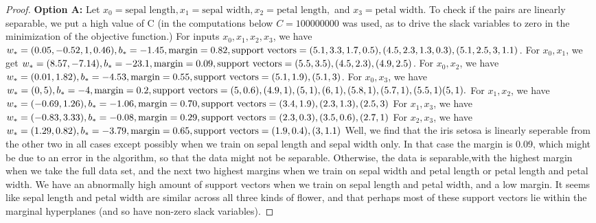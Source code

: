 \documentclass[12pt]{article}
\begin{document}
\begin{proof}  \bigbreak
  \textbf{ Option A:}
  Let $x_0 = \text {sepal length}, x_1 = \text{sepal width}, x_2 = \text{petal length},$ and $x_3 = \text{petal width}$. To check if the pairs are linearly separable, we put a high value of C
  (in the computations below $C = 100000000$ was used, as to drive the slack variables to zero in the minimization of the objective function.)
  \bigbreak
  For inputs $x_0,x_1,x_2,x_3$, we have $w_* = (0.05, -0.52, 1, 0.46), b_* = -1.45, \text{margin} = 0.82, \\
  \text{support vectors} = (5.1,3.3,1.7,0.5), (4.5,2.3,1.3,0.3), (5.1,2.5,3,1.1)$.
  \bigbreak
  For $x_0, x_1$, we get $w_* = (8.57, -7.14), b_* = -23.1, \text{margin} = 0.09, \\
  \text{support vectors} = (5.5,3.5), (4.5, 2.3), (4.9, 2.5)$.
  \bigbreak
  For $x_0, x_2$, we have $w_* = (0.01, 1.82), b_*=-4.53, \text{margin} = 0.55, \\
  \text{support vectors} = (5.1,1.9), (5.1, 3)$.
  \bigbreak
  For $x_0, x_3$, we have $w_* = (0, 5), b_* = -4, \text{margin} = 0.2, \\
  \text{support vectors} = (5, 0.6), (4.9,1), (5, 1), (6,1), (5.8, 1), (5.7, 1), (5.5, 1) (5, 1).$
  \bigbreak
  For $x_1, x_2$, we have $w_* = (-0.69, 1.26), b_* = -1.06, \text{margin} = 0.70, \\
  \text{support vectors} = (3.4,1.9), (2.3,1.3), (2.5,3)$
  \bigbreak
  For $x_1, x_3$, we have $w_* = (-0.83, 3.33), b_* = -0.08, \text{margin} = 0.29, \\
  \text{support vectors} = (2.3,0.3), (3.5, 0.6), (2.7, 1)$
  \bigbreak
  For $x_2, x_3$, we have $w_* = (1.29, 0.82), b_* = -3.79, \text{margin} = 0.65, \\
  \text{support vectors} = (1.9,0.4), (3, 1.1)$
  \bigbreak
  Well, we find that the iris setosa is linearly seperable from the other two in all cases except possibly when we train on sepal length and sepal width only. In that case the margin is 0.09, which
  might be due to an error in the algorithm, so that the data might not be separable. Otherwise, the data is separable,with the highest margin when we take the full data set, and the next two highest margins
  when we train on sepal width and petal length or petal length and petal width. We have an abnormally high amount of support vectors when we train on sepal length and petal width, and a low margin. It seems like
  sepal length and petal width are similar across all three kinds of flower, and that perhaps most of these support vectors lie within the marginal hyperplanes (and so have non-zero slack variables).

\end{proof}
\end{document}
